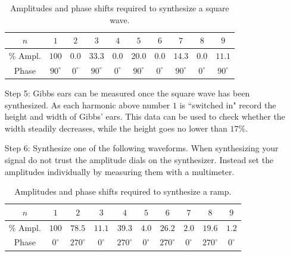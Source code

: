 \documentclass[12pt, a4paper, oneside, openright, titlepage]{book}
\begin{document}
\begin{itemize}[leftmargin = 50pt]
        \begin{table}[H]
            \centering 
            \caption{Amplitudes and phase shifts required to synthesize a square wave.}
            \begin{tabular}{|c|c|c|c|c|c|c|c|c|c|}
                \hline
                $n$ & $1$ & $2$ & $3$ & $4$ & $5$ & $6$ & $7$ & $8$ & $9$ \\ \hline
                \% Ampl. & $100$ & $0.0 $& $33.3$ & $0.0$ & $20.0$ & $0.0$ & $14.3$ & $0.0$ & $11.1$ \\ 
                Phase & $90^{\circ}$ & $0^{\circ}$ & $90^{\circ}$ & $0^{\circ}$ & $90^{\circ}$ & $0^{\circ}$ & $90^{\circ}$ & $0^{\circ}$ & $90^{\circ}$ \\ \hline
            \end{tabular}
            \label{tab:FS1}
        \end{table}
    \item[Step 5:] Gibbs ears can be measured once the square wave has been synthesized. As each harmonic above number $1$ is ``switched in" record the height and width of Gibbs' ears. This data can be used to check whether the width steadily decreases, while the height goes no lower than $17\%$.
    \item[Step 6:] Synthesize one of the following waveforms. When synthesizing your signal do not trust the amplitude dials on the synthesizer. Instead set the amplitudes individually by measuring them with a multimeter.
        \begin{table}[H]
            \centering 
            \caption{Amplitudes and phase shifts required to synthesize a ramp.}
            \begin{tabular}{|c|c|c|c|c|c|c|c|c|c|}
                \hline
                $n$ & $1$ & $2$ & $3$ & $4$ & $5$ & $6$ & $7$ & $8$ & $9$ \\ \hline
                \% Ampl. & $100$ & $78.5 $& $11.1$ & $39.3$ & $4.0$ & $26.2$ & $2.0$ & $19.6$ & $1.2$ \\ 
                Phase & $0^{\circ}$ & $270^{\circ}$ & $0^{\circ}$ & $270^{\circ}$ & $0^{\circ}$ & $270^{\circ}$ & $0^{\circ}$ & $270^{\circ}$ & $0^{\circ}$ \\ \hline
            \end{tabular}
            \label{tab:FS2}
        \end{table}


\end{itemize}
\end{document}
